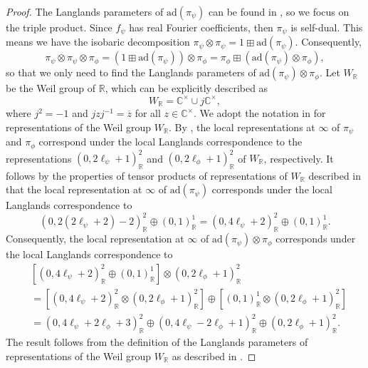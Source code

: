\documentclass[11pt]{amsart}
\theoremstyle{definition}
\begin{document}
\begin{proof}
The Langlands parameters of $\mathrm{ad}(\pi_{\psi})$ can be found in \cite[\S 5.12]{IwaniecKowalski}, so we focus on the triple product. Since $f_{\psi}$ has real Fourier coefficients, then $\pi_{\psi}$ is self-dual. This means we have the isobaric decomposition $\pi_{\psi} \otimes \pi_{\psi} = 1 \boxplus \mathrm{ad}(\pi_{\psi})$. Consequently, $$ \pi_{\psi} \otimes \pi_{\psi} \otimes \pi_{\phi} = (1 \boxplus \mathrm{ad}(\pi_{\psi})) \otimes \pi_{\phi} = \pi_{\phi} \boxplus (\mathrm{ad}(\pi_{\psi}) \otimes \pi_{\phi}),$$ so that we only need to find the Langlands parameters of $\mathrm{ad}(\pi_{\psi}) \otimes \pi_{\phi}$. Let $W_{\mathbb{R}}$ be the Weil group of $\mathbb{R}$, which can be explicitly described as $$W_{\mathbb{R}} = \mathbb{C}^{\times} \cup j\mathbb{C}^{\times},$$ where $j^2 = -1$ and $j z j^{-1} = \overline{z}$ for all $z\in \mathbb{C}^{\times}$. We adopt the notation in \cite[\S 3]{KnappLLCArchimedean} for representations of the Weil group $W_{\mathbb{R}}$. By \cite[Prop.~5.21]{GelbartAutFormsAdeleGps}, the local representations at $\infty$ of $\pi_{\psi}$ and $\pi_{\phi}$ correspond under the local Langlands correspondence to the representations $(0,2\ell_{\psi}+1)_{\mathbb{R}}^{2}$ and $(0,2\ell_{\phi}+1)_{\mathbb{R}}^{2}$ of $W_{\mathbb{R}}$, respectively. It follows by the properties of tensor products of representations of $W_{\mathbb{R}}$ described in \cite[\S 3.1]{WatsonPhD} that the local representation at $\infty$ of $\mathrm{ad}(\pi_{\psi})$ corresponds under the local Langlands correspondence to $$ (0,2(2\ell_{\psi}+2)-2)_{\mathbb{R}}^{2} \oplus (0,1)_{\mathbb{R}}^{1} = (0,4\ell_{\psi}+2)_{\mathbb{R}}^{2} \oplus (0,1)_{\mathbb{R}}^{1}.$$ Consequently, the local representation at $\infty$ of $\mathrm{ad}(\pi_{\psi}) \otimes \pi_{\phi}$ corresponds under the local Langlands correspondence to
\begin{align*}
    &\left[ (0,4\ell_{\psi}+2)_{\mathbb{R}}^{2} \oplus (0,1)_{\mathbb{R}}^{1} \right] \otimes (0,2\ell_{\phi}+1)_{\mathbb{R}}^{2} \\
    &= \left[ (0,4\ell_{\psi}+2)_{\mathbb{R}}^{2} \otimes (0,2\ell_{\phi}+1)_{\mathbb{R}}^{2} \right] \oplus \left[ (0,1)_{\mathbb{R}}^{1} \otimes (0,2\ell_{\phi}+1)_{\mathbb{R}}^{2} \right] \\
    &= (0,4\ell_{\psi}+2\ell_{\phi}+3)_{\mathbb{R}}^{2} \oplus (0,4\ell_{\psi} - 2\ell_{\phi}+1)_{\mathbb{R}}^{2} \oplus (0,2\ell_{\phi}+1)_{\mathbb{R}}^{2}.
\end{align*}
The result follows from the definition of the Langlands parameters of representations of the Weil group $W_{\mathbb{R}}$ as described in \cite[\S 3.1]{WatsonPhD}.
\end{proof}
\end{document}
